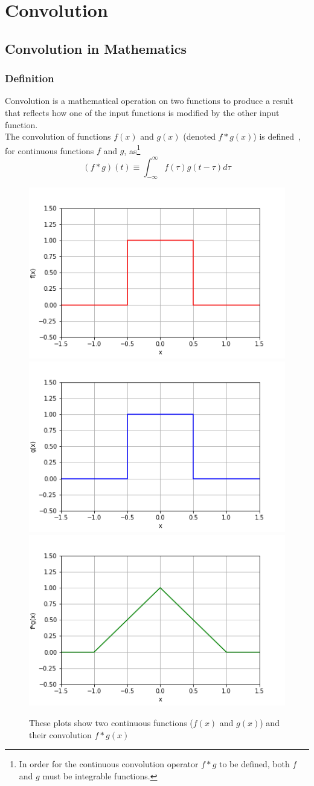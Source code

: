 \chapter[Convolution]{Convolution}
\label{ch:convolution}
\section{Convolution in Mathematics}
\label{sec:convolution:mathematics}
\subsection{Definition}
\label{sec:convolution:mathematics:definitions}
Convolution is a mathematical operation on two functions to produce a result that reflects how one of the input functions is modified by the other input function.\\
The convolution of functions $f(x)$ and $g(x)$ (denoted $f*g(x)$) is defined~\citep{Bracewell2000}, for continuous functions $f$ and $g$, as\footnote{In order for the continuous convolution operator $f * g$ to be defined, both $f$ and $g$ must be integrable functions.}
\begin{equation}
(f * g) (t)\equiv\int_{-\infty}^{\infty} f(\tau) g(t-\tau)d\tau
\end{equation}
\begin{figure}[h]
    \includegraphics[width=.32\linewidth]{graphics/convolution/convolution_continuos_f_gebs.png}
    \includegraphics[width=.32\linewidth]{graphics/convolution/convolution_continuos_g_gebs.png}
    \includegraphics[width=.32\linewidth]{graphics/convolution/convolution_continuos_fg_gebs.png}
    \caption{These plots show two continuous functions ($f(x)$ and $g(x)$) and their convolution $f*g(x)$}
    \label{fig:continuousconvolution}
\end{figure}
